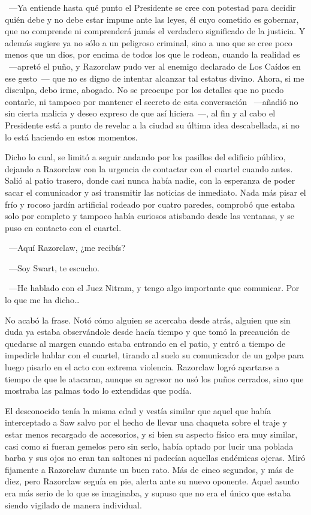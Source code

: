 ~---Ya entiende hasta qué punto el Presidente se cree con potestad para decidir quién debe y no debe estar impune ante las leyes, él cuyo cometido es gobernar, que no comprende ni comprenderá jamás el verdadero significado de la justicia. Y además sugiere ya no sólo a un peligroso criminal, sino a uno que se cree poco menos que un dios, por encima de todos los que le rodean, cuando la realidad es ~---apretó el puño, y Razorclaw pudo ver al enemigo declarado de Los Caídos en ese gesto~--- que no es digno de intentar alcanzar tal estatus divino. Ahora, si me disculpa, debo irme, abogado. No se preocupe por los detalles que no puedo contarle, ni tampoco por mantener el secreto de esta conversación ~---añadió no sin cierta malicia y deseo expreso de que así hiciera~---, al fin y al cabo el Presidente está a punto de revelar a la ciudad su última idea descabellada, si no lo está haciendo en estos momentos.

Dicho lo cual, se limitó a seguir andando por los pasillos del edificio público, dejando a Razorclaw con la urgencia de contactar con el cuartel cuando antes. Salió al patio trasero, donde casi nunca había nadie, con la esperanza de poder sacar el comunicador y así transmitir las noticias de inmediato. Nada más pisar el frío y rocoso jardín artificial rodeado por cuatro paredes, comprobó que estaba solo por completo y tampoco había curiosos atisbando desde las ventanas, y se puso en contacto con el cuartel.

~---Aquí Razorclaw, ¿me recibís?

~---Soy Swart, te escucho.

~---He hablado con el Juez Nitram, y tengo algo importante que comunicar. Por lo que me ha dicho\dots

No acabó la frase. Notó cómo alguien se acercaba desde atrás, alguien que sin duda ya estaba observándole desde hacía tiempo y que tomó la precaución de quedarse al margen cuando estaba entrando en el patio, y entró a tiempo de impedirle hablar con el cuartel, tirando al suelo su comunicador de un golpe para luego pisarlo en el acto con extrema violencia. Razorclaw logró apartarse a tiempo de que le atacaran, aunque su agresor no usó los puños cerrados, sino que mostraba las palmas todo lo extendidas que podía.

El desconocido tenía la misma edad y vestía similar que aquel que había interceptado a Saw salvo por el hecho de llevar una chaqueta sobre el traje y estar menos recargado de accesorios, y si bien su aspecto físico era muy similar, casi como si fueran gemelos pero sin serlo, había optado por lucir una poblada barba y sus ojos no eran tan saltones ni padecían aquellas endémicas ojeras. Miró fijamente a Razorclaw durante un buen rato. Más de cinco segundos, y más de diez, pero Razorclaw seguía en pie, alerta ante su nuevo oponente. Aquel asunto era más serio de lo que se imaginaba, y supuso que no era el único que estaba siendo vigilado de manera individual.

